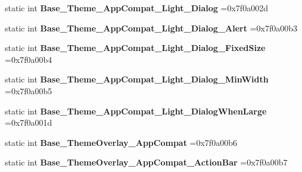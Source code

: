 \begin{DoxyCompactItemize}
static int {\bfseries Base\+\_\+\+Theme\+\_\+\+App\+Compat\+\_\+\+Light\+\_\+\+Dialog} =0x7f0a002d
\item 
\mbox{\label{classandroid_1_1support_1_1graphics_1_1drawable_1_1animated_1_1R_1_1style_afd268dd35e151f939ec6b6399f1b7988}} 
static int {\bfseries Base\+\_\+\+Theme\+\_\+\+App\+Compat\+\_\+\+Light\+\_\+\+Dialog\+\_\+\+Alert} =0x7f0a00b3
\item 
\mbox{\label{classandroid_1_1support_1_1graphics_1_1drawable_1_1animated_1_1R_1_1style_a35c6a832743085b2ee0fb35062cf1786}} 
static int {\bfseries Base\+\_\+\+Theme\+\_\+\+App\+Compat\+\_\+\+Light\+\_\+\+Dialog\+\_\+\+Fixed\+Size} =0x7f0a00b4
\item 
\mbox{\label{classandroid_1_1support_1_1graphics_1_1drawable_1_1animated_1_1R_1_1style_a1fe34d7b30b835ca9967e117649e4d3c}} 
static int {\bfseries Base\+\_\+\+Theme\+\_\+\+App\+Compat\+\_\+\+Light\+\_\+\+Dialog\+\_\+\+Min\+Width} =0x7f0a00b5
\item 
\mbox{\label{classandroid_1_1support_1_1graphics_1_1drawable_1_1animated_1_1R_1_1style_a1edafd6a9ceb9c0828a2a8b8a9ae30a4}} 
static int {\bfseries Base\+\_\+\+Theme\+\_\+\+App\+Compat\+\_\+\+Light\+\_\+\+Dialog\+When\+Large} =0x7f0a001d
\item 
\mbox{\label{classandroid_1_1support_1_1graphics_1_1drawable_1_1animated_1_1R_1_1style_a803378f6d7b514657e695c3f528e68dc}} 
static int {\bfseries Base\+\_\+\+Theme\+Overlay\+\_\+\+App\+Compat} =0x7f0a00b6
\item 
\mbox{\label{classandroid_1_1support_1_1graphics_1_1drawable_1_1animated_1_1R_1_1style_a4538a7c87318f08dff6dd01db41888b2}} 
static int {\bfseries Base\+\_\+\+Theme\+Overlay\+\_\+\+App\+Compat\+\_\+\+Action\+Bar} =0x7f0a00b7
\item 
\mbox{\label{classandroid_1_1support_1_1graphics_1_1drawable_1_1animated_1_1R_1_1style_a29ee160a253aac59acf9d13d0bf3eb2f}} 

\end{DoxyCompactItemize}
